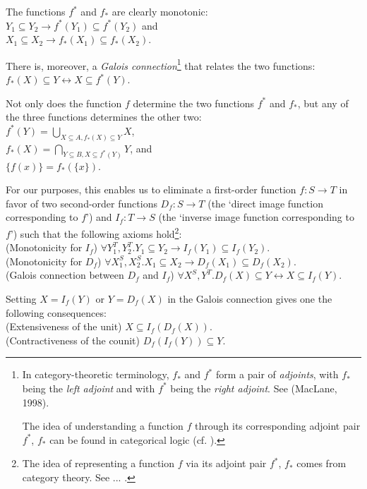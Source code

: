 \documentclass[12pt]{book}
\begin{document}
The functions $f^*$ and $f_*$ are clearly monotonic:\\
\indent $Y_1 \subseteq Y_2 \rightarrow f^*(Y_1) \subseteq f^*(Y_2)$ and\\
\indent $X_1 \subseteq X_2 \rightarrow f_*(X_1) \subseteq f_*(X_2)$.

There is, moreover, a \textit{Galois connection}\footnote{In category-theoretic terminology, $f_*$ and $f^*$ form a pair of \textit{adjoints}, with $f_*$ being the \textit{left adjoint} and with $f^*$ being the \textit{right adjoint}. See (MacLane, 1998).

The idea of understanding a function $f$ through its corresponding adjoint pair $f^*$, $f_*$ can be found in categorical logic (cf. ).} that relates the two functions:\\
\indent $f_*(X) \subseteq Y \leftrightarrow X \subseteq f^*(Y)$.

Not only does the function $f$ determine the two functions $f^*$ and $f_*$, but any of the three functions determines the other two:\\
\indent $f^*(Y) = \bigcup\limits_{X \subseteq A, f_*(X) \subseteq Y} X$,\\
\indent $f_*(X) = \bigcap\limits_{Y \subseteq B, X \subseteq f^*(Y)} Y$, and\\
\indent $\{f(x)\} = f_*(\{x\})$.

For our purposes, this enables us to eliminate a first-order function $f:S \rightarrow T$ in favor of two second-order functions $D_f: S \rightarrow T$ (the `direct image function corresponding to $f$') and $I_f: T \rightarrow S$ (the `inverse image function corresponding to $f$') such that the following axioms hold\footnote{The idea of representing a function $f$ via its adjoint pair $f^*$, $f_*$ comes from category theory. See ... .}:\\
\indent (Monotonicity for $I_f$) $\forall Y_1^T, Y_2^T. Y_1 \subseteq Y_2 \rightarrow I_f(Y_1) \subseteq I_f(Y_2)$.\\
\indent (Monotonicity for $D_f$) $\forall X_1^S, X_2^S.X_1 \subseteq X_2 \rightarrow D_f(X_1) \subseteq D_f(X_2)$.\\
\indent (Galois connection between $D_f$ and $I_f$) $\forall X^S, Y^T.D_f(X) \subseteq Y \leftrightarrow X \subseteq I_f(Y)$.

Setting $X = I_f(Y)$ or $Y = D_f(X)$ in the Galois connection gives one the following consequences:\\
\indent (Extensiveness of the unit) $X \subseteq I_f(D_f(X))$.\\
\indent (Contractiveness of the counit) $D_f(I_f(Y)) \subseteq Y$.
\end{document}
